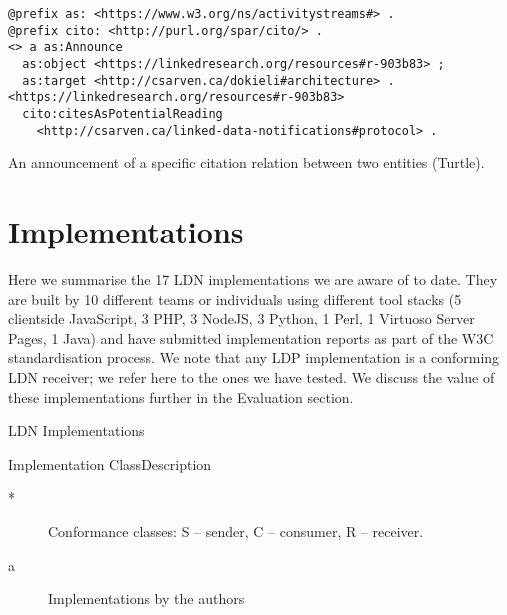                                     
                                        \begin{verbatim}@prefix as: <https://www.w3.org/ns/activitystreams#> .
@prefix cito: <http://purl.org/spar/cito/> .
<> a as:Announce
  as:object <https://linkedresearch.org/resources#r-903b83> ;
  as:target <http://csarven.ca/dokieli#architecture> .
<https://linkedresearch.org/resources#r-903b83>
  cito:citesAsPotentialReading
    <http://csarven.ca/linked-data-notifications#protocol> .\end{verbatim}
                                        An announcement of a specific citation relation between two entities (Turtle).
                                    
                                
                            
                        
                    

                    
                        \section{Implementations}
  \label{implementations}

                        
                            
\par Here we summarise the 17 LDN implementations we are aware of to date. They are built by 10 different teams or individuals using different tool stacks (5 clientside JavaScript, 3 PHP, 3 NodeJS, 3 Python, 1 Perl, 1 Virtuoso Server Pages, 1 Java) and have submitted \empty implementation reports as part of the W3C standardisation process. We note that any \empty LDP implementation is a conforming LDN receiver; we refer here to the ones we have tested. We discuss the value of these implementations further in the \empty Evaluation section.

                            
                                LDN Implementations
                                
                                    
                                        Implementation
                                        Class\empty *
                                        Description
                                    
                                
                                
                                    
                                        \begin{description}
  \item[*] Conformance classes: S – sender, C – consumer, R – receiver.\item[a] Implementations by the authors
    \end{description}
  
